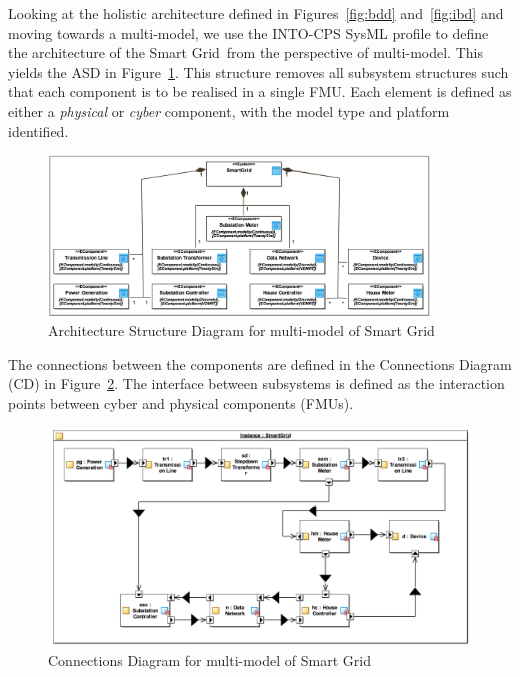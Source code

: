 
Looking at the holistic architecture defined in Figures~\ref{fig:bdd} and~\ref{fig:ibd} and moving towards a multi-model, we use the INTO-CPS SysML profile to define the architecture of the Smart Grid\ from the perspective of multi-model. This yields the ASD in Figure~\ref{fig:asd_mm}. This structure removes all subsystem structures such that each component is to be realised in a single FMU. Each element is defined as either a \emph{physical} or \emph{cyber} component, with the model type and platform identified.

\begin{figure}[htbp]
\centering
\includegraphics[width=0.9\textwidth]{figures/ASD_mm}
\caption{Architecture Structure Diagram for multi-model of Smart Grid}
\label{fig:asd_mm}
\end{figure}

The connections between the components are defined in the Connections Diagram (CD) in Figure~\ref{fig:cd_mm}. The interface between subsystems is defined as the interaction points between cyber and physical components (FMUs).

\begin{figure}
\centering
\includegraphics[width=1\textwidth]{figures/CD_mm}
\caption{Connections Diagram for multi-model of Smart Grid}
\label{fig:cd_mm}
\end{figure}

